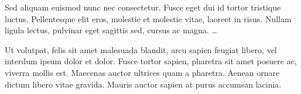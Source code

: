 \documentclass[
journal=jpcbfk, %
manuscript=article]{achemso}
\begin{document}
\acknowledgement

Sed aliquam euismod nunc nec consectetur. Fusce eget dui id tortor tristique luctus. Pellentesque elit eros, molestie et molestie vitae, laoreet in risus. Nullam ligula lectus, pulvinar eget sagittis sed, cursus ac magna. \ldots


\suppinfo

Ut volutpat, felis sit amet malesuada blandit, arcu sapien feugiat libero, vel interdum ipsum dolor et dolor. Fusce tortor sapien, pharetra sit amet posuere ac, viverra mollis est. Maecenas auctor ultrices quam a pharetra. Aenean ornare dictum libero vitae gravida. Mauris auctor sapien at purus accumsan lacinia.


\end{document}
